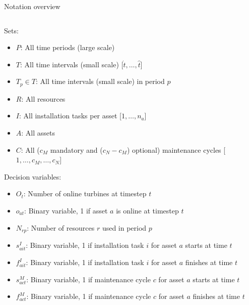 \documentclass{beamer}
\begin{document}
\begin{frame}{Notation overview}
\tiny

\begin{columns}
\begin{column}{.48\textwidth}
Sets:
\begin{itemize}
\item $P$: All time periods (large scale)
\item $T$: All time intervals (small scale) [$\dot{t}, \dots , \hat{t}$]
\item $T_p \in T$: All time intervals (small scale) in period $p$
\item $R$: All resources
\item $I$: All installation tasks per asset [$1, \dots , n_a$]
\item $A$: All assets
\item $C$: All ($c_M$ mandatory and ($c_N - c_M$) optional) maintenance cycles [$1, \dots , c_M, \dots , c_N$]
\end{itemize}

Decision variables:
\begin{itemize}
\item $O_{t}$: Number of online turbines at timestep $t$
\item $o_{at}$: Binary variable, 1 if asset $a$ is online at timestep $t$
\item $N_{rp}$: Number of resources $r$ used in period $p$
\item $s^I_{ait}$: Binary variable, 1 if installation task $i$ for asset $a$ starts at time $t$
\item $f^I_{ait}$: Binary variable, 1 if installation task $i$ for asset $a$ finishes at time $t$
\item $s^M_{act}$: Binary variable, 1 if maintenance cycle $c$ for asset $a$ starts at time $t$
\item $f^M_{act}$: Binary variable, 1 if maintenance cycle $c$ for asset $a$ finishes at time $t$
\end{itemize}
\end{column}

\hfill


\end{columns}
\end{frame}
\end{document}

